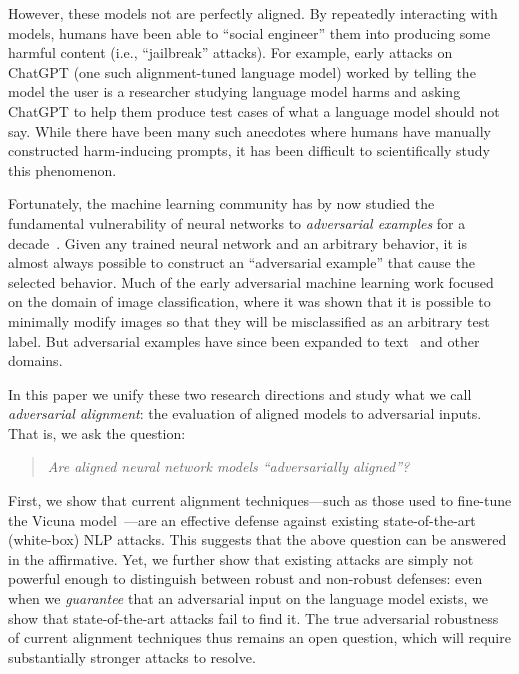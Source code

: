 \documentclass{article}
\newcommand{\pw}[1]{\textcolor{blue}{[PW: #1]}}
\newcommand\kl[1]{\textcolor{darkgreen}{KL: #1}}
\renewcommand{\cite}{\citep}
\begin{document}
However, these models not are perfectly aligned.
%
By repeatedly interacting with models, humans have been able
to ``social engineer'' them into producing some harmful content (i.e., ``jailbreak'' attacks).
%
For example, early attacks on ChatGPT (one such alignment-tuned language model)
worked by telling the model the user is a researcher studying language
model harms and asking ChatGPT to help them produce test cases of what
a language model should not say.
%
While there have been many such anecdotes where humans
have manually constructed harm-inducing prompts,
it has been difficult to scientifically study this phenomenon.

Fortunately, the machine learning community has by now
studied the fundamental vulnerability of neural networks to
\emph{adversarial examples} for a decade~\citep{szegedy2013intriguing, biggio2013evasion}.
%
Given any trained neural network and an arbitrary behavior, it is almost
always possible to construct an ``adversarial example'' that cause the selected behavior.
%
Much of the early adversarial machine learning work focused on the domain of image classification,
where it was shown that it is possible to minimally modify images
so that they will be misclassified as an arbitrary test label.
%
But adversarial examples have since been expanded to text~\cite{jia2017adversarial, ebrahimi2017hotflip, alzantot2018generating, wallace2019universal, jones2023automatically} and other domains. 

In this paper we unify these two research directions and
study what we call \emph{adversarial alignment}:
the evaluation of aligned models to adversarial inputs.
That is, we ask the question:
%
\begin{quote}
\center
    \emph{Are aligned neural network models ``adversarially aligned''?}
\end{quote}


First, we show that current alignment techniques---such as those used to fine-tune the Vicuna model~\cite{vicuna2023}---are an effective defense against existing state-of-the-art (white-box) NLP attacks. This suggests that the above question can be answered in the affirmative. Yet, we further show that existing attacks are simply not powerful enough to distinguish between robust and non-robust defenses: even when we \emph{guarantee} that an adversarial input on the language model exists, we show that state-of-the-art attacks fail to find it. The true adversarial robustness of current alignment techniques thus remains an open question, which will require substantially stronger attacks to resolve.
\end{document}
